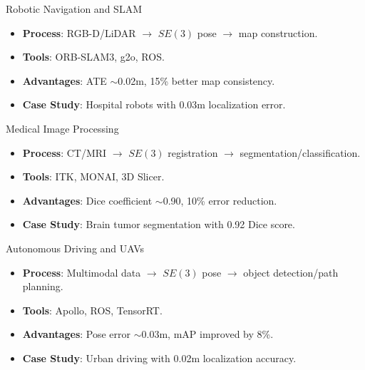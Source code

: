\documentclass{beamer}
\begin{document}
\begin{frame}{Robotic Navigation and SLAM}
  \begin{itemize}
    \item<1-> \textbf{Process}: RGB-D/LiDAR $\to$ $SE(3)$ pose $\to$ map construction.
    \item<2-> \textbf{Tools}: ORB-SLAM3, g2o, ROS.
    \item<3-> \textbf{Advantages}: ATE $\sim$0.02m, 15\% better map consistency.
    \item<4-> \textbf{Case Study}: Hospital robots with 0.03m localization error.
  \end{itemize}
\end{frame}

\begin{frame}{Medical Image Processing}
  \begin{itemize}
    \item<1-> \textbf{Process}: CT/MRI $\to$ $SE(3)$ registration $\to$ segmentation/classification.
    \item<2-> \textbf{Tools}: ITK, MONAI, 3D Slicer.
    \item<3-> \textbf{Advantages}: Dice coefficient $\sim$0.90, 10\% error reduction.
    \item<4-> \textbf{Case Study}: Brain tumor segmentation with 0.92 Dice score.
  \end{itemize}
\end{frame}

\begin{frame}{Autonomous Driving and UAVs}
  \begin{itemize}
    \item<1-> \textbf{Process}: Multimodal data $\to$ $SE(3)$ pose $\to$ object detection/path planning.
    \item<2-> \textbf{Tools}: Apollo, ROS, TensorRT.
    \item<3-> \textbf{Advantages}: Pose error $\sim$0.03m, mAP improved by 8\%.
    \item<4-> \textbf{Case Study}: Urban driving with 0.02m localization accuracy.
  \end{itemize}
\end{frame}

\end{document}
